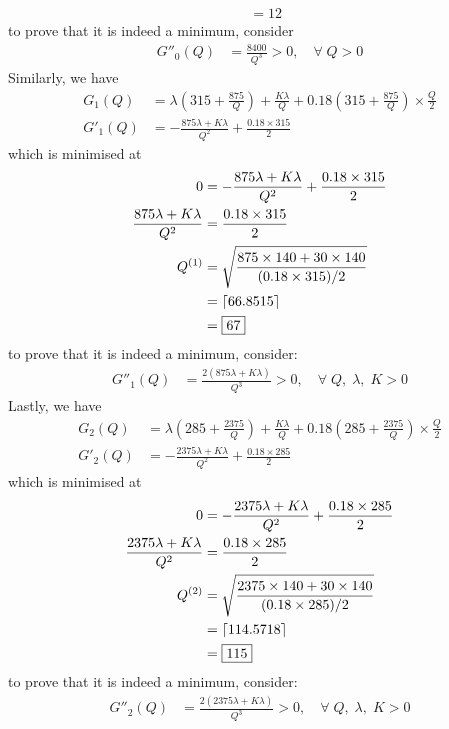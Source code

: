 \documentclass[12pt]{article}
\begin{document}
\begin{align*}
    &= \boxed{12}
\end{align*} to prove that it is indeed a minimum, consider \begin{align*}
    G''_0(Q) &= \frac{8400}{Q^{3}} > 0, \quad \forall \; Q>0
\end{align*} Similarly, we have \begin{align*}
    G_1(Q) &= \lambda\left( 315 + \frac{875}{Q} \right) + \frac{K\lambda}{Q} + 0.18\left( 315 + \frac{875}{Q} \right)\times \frac{Q}{2} \\ 
    G'_1(Q) &= - \frac{875\lambda + K\lambda}{Q^{2}} + \frac{0.18\times 315}{2} 
\end{align*} which is minimised at \begin{align*}
    0 &= - \frac{875\lambda + K\lambda}{Q^{2}} + \frac{0.18\times 315}{2} \\ 
    \frac{875\lambda + K\lambda}{Q^{2}} &= \frac{0.18\times 315}{2} \\
    Q^{(1)} &= \sqrt{ \frac{875\times 140+ 30\times 140}{(0.18 \times 315 )/ 2}} \\ 
    &= \lceil66.8515\rceil \\ 
    &= \boxed{67}
\end{align*} to prove that it is indeed a minimum, consider: \begin{align*}
    G''_1(Q) &= \frac{2(875\lambda +K\lambda)}{Q^{3}} > 0, \quad \forall \; Q, \; \lambda, \; K >0
\end{align*} Lastly, we have \begin{align*}
    G_2(Q) &= \lambda\left( 285 + \frac{2375}{Q} \right) + \frac{K\lambda}{Q} + 0.18\left( 285 + \frac{2375}{Q} \right)\times \frac{Q}{2} \\ 
    G'_2(Q) &= - \frac{2375\lambda + K\lambda}{Q^{2}} + \frac{0.18\times 285}{2} 
\end{align*} which is minimised at \begin{align*}
    0 &= - \frac{2375\lambda + K\lambda}{Q^{2}} + \frac{0.18\times 285}{2} \\ 
    \frac{2375\lambda + K\lambda}{Q^{2}} &= \frac{0.18\times 285}{2} \\
    Q^{(2)} &= \sqrt{ \frac{2375\times 140+ 30\times 140}{(0.18 \times 285)/ 2}} \\ 
    &= \lceil114.5718\rceil \\ 
    &= \boxed{115}
\end{align*} to prove that it is indeed a minimum, consider: \begin{align*}
    G''_2(Q) &= \frac{2(2375\lambda +K\lambda)}{Q^{3}} > 0, \quad \forall \; Q, \; \lambda, \; K >0

\end{align*}
\end{document}
